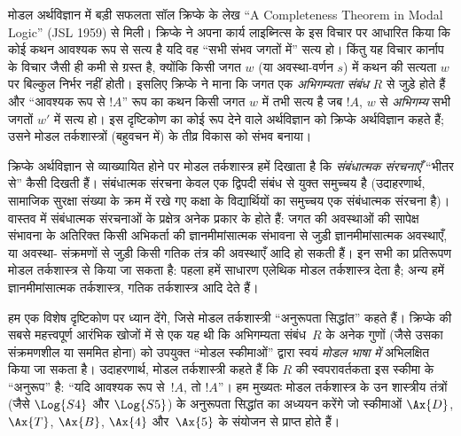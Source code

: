 \documentclass[../../../include/open-logic-section]{subfiles}
\begin{document}
मोडल अर्थविज्ञान में बड़ी सफलता सॉल क्रिप्के के लेख ``A Completeness Theorem
in Modal Logic'' (JSL 1959) से मिली। क्रिप्के ने अपना कार्य लाइब्नित्स के इस
विचार पर आधारित किया कि कोई कथन आवश्यक रूप से सत्य है यदि वह ``सभी संभव
जगतों में'' सत्य हो। किंतु यह विचार कार्नाप के विचार जैसी ही कमी से ग्रस्त
है, क्योंकि किसी जगत $w$ (या अवस्था-वर्णन $s$) में कथन की सत्यता $w$ पर
बिल्कुल निर्भर नहीं होती। इसलिए क्रिप्के ने माना कि जगत एक
\emph{अभिगम्यता संबंध} $R$ से जुड़े होते हैं और ``आवश्यक रूप से $!A$'' रूप
का कथन किसी जगत $w$ में तभी सत्य है जब $!A$, $w$ से \emph{अभिगम्य} सभी
जगतों $w'$ में सत्य हो। इस दृष्टिकोण का कोई रूप देने वाले अर्थविज्ञान को
क्रिप्के अर्थविज्ञान कहते हैं; उसने मोडल तर्कशास्त्रों (बहुवचन में) के तीव्र
विकास को संभव बनाया।

क्रिप्के अर्थविज्ञान से व्याख्यायित होने पर मोडल तर्कशास्त्र हमें दिखाता है
कि \emph{संबंधात्मक संरचनाएँ} ``भीतर से'' कैसी दिखती हैं। संबंधात्मक संरचना
केवल एक द्विपदी संबंध से युक्त समुच्चय है (उदाहरणार्थ, सामाजिक सुरक्षा
संख्या के क्रम में रखे गए कक्षा के विद्यार्थियों का समुच्चय एक संबंधात्मक
संरचना है)। वास्तव में संबंधात्मक संरचनाओं के प्रक्षेत्र अनेक प्रकार के
होते हैं: जगत की अवस्थाओं की सापेक्ष संभावना के अतिरिक्त किसी अभिकर्ता की
ज्ञानमीमांसात्मक संभावना से जुड़ी ज्ञानमीमांसात्मक अवस्थाएँ, या अवस्था-
संक्रमणों से जुड़ी किसी गतिक तंत्र की अवस्थाएँ आदि हो सकती हैं। इन सभी का
प्रतिरूपण मोडल तर्कशास्त्र से किया जा सकता है: पहला हमें साधारण एलेथिक मोडल
तर्कशास्त्र देता है; अन्य हमें ज्ञानमीमांसात्मक तर्कशास्त्र, गतिक
तर्कशास्त्र आदि देते हैं।

हम एक विशेष दृष्टिकोण पर ध्यान देंगे, जिसे मोडल तर्कशास्त्री ``अनुरूपता
सिद्धांत'' कहते हैं। क्रिप्के की सबसे महत्त्वपूर्ण आरंभिक खोजों में से एक यह
थी कि अभिगम्यता संबंध~$R$ के अनेक गुणों (जैसे उसका संक्रमणशील या सममित होना)
को उपयुक्त ``मोडल स्कीमाओं'' द्वारा स्वयं \emph{मोडल भाषा में} अभिलक्षित
किया जा सकता है। उदाहरणार्थ, मोडल तर्कशास्त्री कहते हैं कि $R$ की
स्वपरावर्तकता इस स्कीमा के ``अनुरूप'' है: ``यदि आवश्यक रूप से~$!A$, तो
$!A$''। हम मुख्यतः मोडल तर्कशास्त्र के उन शास्त्रीय तंत्रों (जैसे $\Log{S4}$
और $\Log{S5}$) के अनुरूपता सिद्धांत का अध्ययन करेंगे जो स्कीमाओं $\Ax{D}$,
$\Ax{T}$, $\Ax{B}$, $\Ax{4}$ और~$\Ax{5}$ के संयोजन से प्राप्त होते हैं।
\end{document}
